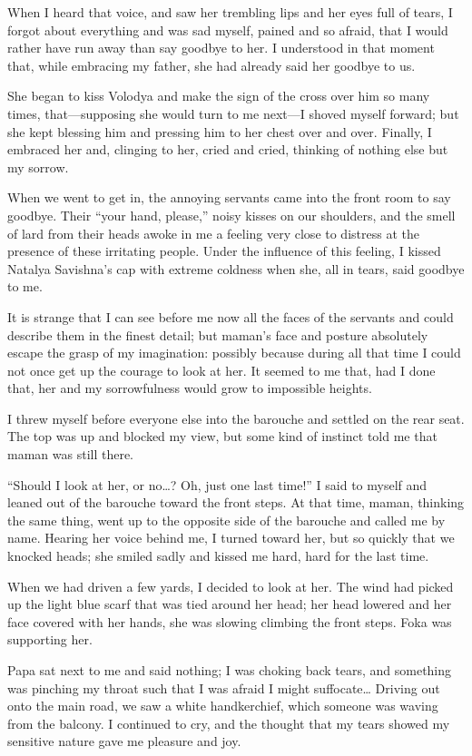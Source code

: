 When I heard that voice, and saw her trembling lips and her eyes full of tears, I forgot about everything and was sad myself, pained and so afraid, that I would rather have run away than say goodbye to her. I understood in that moment that, while embracing my father, she had already said her goodbye to us.

She began to kiss Volodya and make the sign of the cross over him so many times, that---supposing she would turn to me next---I shoved myself forward; but she kept blessing him and pressing him to her chest over and over. Finally, I embraced her and, clinging to her, cried and cried, thinking of nothing else but my sorrow.

When we went to get in, the annoying servants came into the front room to say goodbye. Their ``your hand, please,'' noisy kisses on our shoulders, and the smell of lard from their heads awoke in me a feeling very close to distress at the presence of these irritating people. Under the influence of this feeling, I kissed Natalya Savishna's cap with extreme coldness when she, all in tears, said goodbye to me.

It is strange that I can see before me now all the faces of the servants and could describe them in the finest detail; but maman's face and posture absolutely escape the grasp of my imagination: possibly because during all that time I could not once get up the courage to look at her. It seemed to me that, had I done that, her and my sorrowfulness would grow to impossible heights.

I threw myself before everyone else into the barouche and settled on the rear seat. The top was up and blocked my view, but some kind of instinct told me that maman was still there.

``Should I look at her, or no\ldots{}? Oh, just one last time!'' I said to myself and leaned out of the barouche toward the front steps. At that time, maman, thinking the same thing, went up to the opposite side of the barouche and called me by name. Hearing her voice behind me, I turned toward her, but so quickly that we knocked heads; she smiled sadly and kissed me hard, hard for the last time.

When we had driven a few yards, I decided to look at her. The wind had picked up the light blue scarf that was tied around her head; her head lowered and her face covered with her hands, she was slowing climbing the front steps. Foka was supporting her.

Papa sat next to me and said nothing; I was choking back tears, and something was pinching my throat such that I was afraid I might suffocate\ldots{} Driving out onto the main road, we saw a white handkerchief, which someone was waving from the balcony. I continued to cry, and the thought that my tears showed my sensitive nature gave me pleasure and joy.

